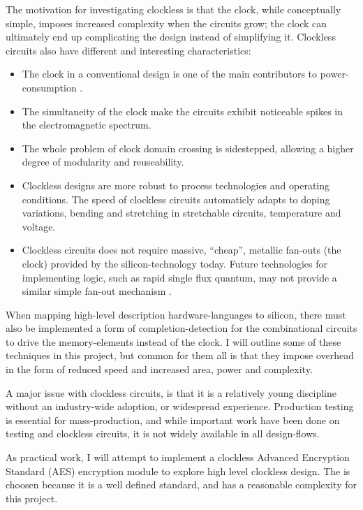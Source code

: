 The motivation for investigating clockless is that the clock, while
conceptually simple, imposes increased complexity when the circuits
grow; the clock can ultimately end up complicating the design instead
of simplifying it. Clockless circuits also have different and
interesting characteristics: \begin{itemize}

\item The clock in a conventional design is one of the main
  contributors to power-consumption \cite{tiwari1998reducing}.

\item The simultaneity of the clock make the circuits exhibit
  noticeable spikes in the electromagnetic spectrum.

\item The whole problem of clock domain crossing is sidestepped,
  allowing a higher degree of modularity and reuseability.

\item Clockless designs are more robust to process technologies and
  operating conditions. The speed of clockless circuits automaticly
  adapts to doping variations, bending and stretching in stretchable
  circuits, temperature and voltage.

\item Clockless circuits does not require massive, ``cheap'', metallic
  fan-outs (the clock) provided by the silicon-technology today. Future
  technologies for implementing logic, such as rapid single flux
  quantum, may not provide a similar simple fan-out mechanism \cite{rapid}.
\end{itemize}

When mapping high-level description hardware-languages to silicon,
there must also be implemented a form of completion-detection for the
combinational circuits to drive the memory-elements instead of the
clock. I will outline some of these techniques in this project, but
common for them all is that they impose overhead in the form of
reduced speed and increased area, power and complexity.

A major issue with clockless circuits, is that it is a relatively
young discipline without an industry-wide adoption, or widespread
experience. Production testing is essential for mass-production, and
while important work have been done on testing and clockless
circuits\cite{fullscan}, it is not widely available in all
design-flows.

As practical work, I will attempt to implement a clockless Advanced
Encryption Standard (AES)\cite{rijandael} encryption module to explore
high level clockless design. The is choosen because it is a well
defined standard, and has a reasonable complexity for this
project.

